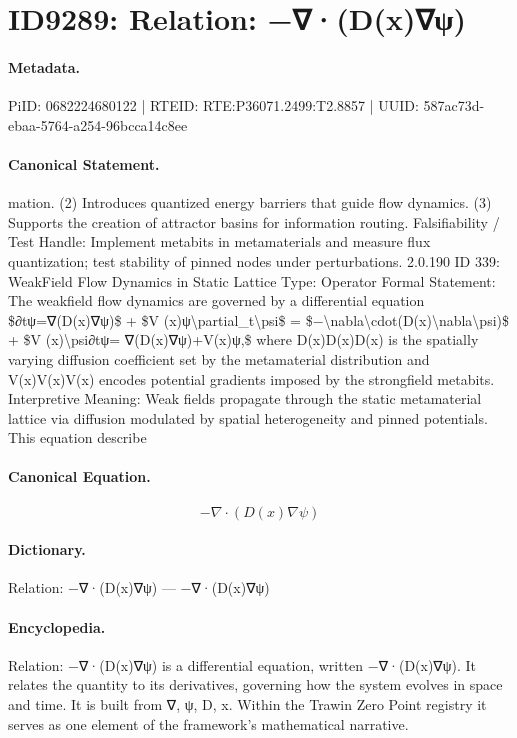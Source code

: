 \section*{ID9289: Relation: −∇·(D(x)∇ψ)}
\paragraph{Metadata.}
PiID: 0682224680122 | RTEID: RTE:P36071.2499:T2.8857 | UUID: 587ac73d-ebaa-5764-a254-96bcca14c8ee

\paragraph{Canonical Statement.}
mation. (2) Introduces quantized energy barriers that guide flow dynamics. (3) Supports the creation of attractor basins for information routing. Falsifiability / Test Handle: Implement metabits in metamaterials and measure flux quantization; test stability of pinned nodes under perturbations. 2.0.190 ID 339: WeakField Flow Dynamics in Static Lattice Type: Operator Formal Statement: The weakfield flow dynamics are governed by a differential equation \$∂tψ=∇(D(x)∇ψ)\$ + \$V (x)ψ\textbackslash{}partial\_t\textbackslash{}psi\$ = \$−\textbackslash{}nabla\textbackslash{}cdot(D(x)\textbackslash{}nabla\textbackslash{}psi)\$ + \$V (x)\textbackslash{}psi∂tψ= ∇(D(x)∇ψ)+V(x)ψ,\$ where D(x)D(x)D(x) is the spatially varying diffusion coefficient set by the metamaterial distribution and V(x)V(x)V(x) encodes potential gradients imposed by the strongfield metabits. Interpretive Meaning: Weak fields propagate through the static metamaterial lattice via diffusion modulated by spatial heterogeneity and pinned potentials. This equation describe

\paragraph{Canonical Equation.}
\[
−\nabla\cdot(D(x)\nabla\psi)
\]

\paragraph{Dictionary.}
Relation: −∇·(D(x)∇ψ) — −∇·(D(x)∇ψ)

\paragraph{Encyclopedia.}
Relation: −∇·(D(x)∇ψ) is a differential equation, written −∇·(D(x)∇ψ). It relates the quantity to its derivatives, governing how the system evolves in space and time. It is built from ∇, ψ, D, x. Within the Trawin Zero Point registry it serves as one element of the framework's mathematical narrative.
